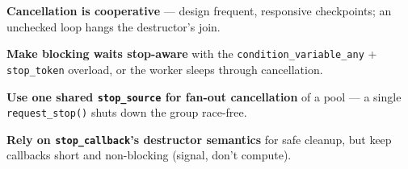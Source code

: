 \textbf{Cancellation is cooperative} --- design frequent, responsive checkpoints; an unchecked loop hangs the destructor's join.

\textbf{Make blocking waits stop-aware} with the \texttt{condition\_variable\_any} + \texttt{stop\_token} overload, or the worker sleeps through cancellation.

\textbf{Use one shared \texttt{stop\_source} for fan-out cancellation} of a pool --- a single \texttt{request\_stop()} shuts down the group race-free.

\textbf{Rely on \texttt{stop\_callback}'s destructor semantics} for safe cleanup, but keep callbacks short and non-blocking (signal, don't compute).
